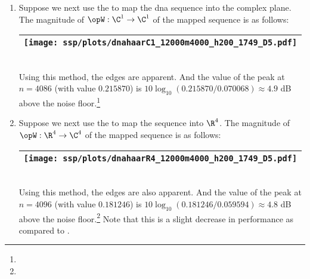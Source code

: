 \begin{example}
\begin{enumerate}
  \item \label{item:dna_haar_C1}
    Suppose we next use the   to map
    the dna sequence into the complex plane.
    The magnitude of $\opW:\C^1\to\C^1$ of the mapped sequence is as follows:
     \\\begin{tabular}{|>{\scs}c|}
          \hline
          \texttt{[image: ssp/plots/dnahaarC1\_12000m4000\_h200\_1749\_D5.pdf]}%
        \\\hline
     \end{tabular}\\
     Using this method, the edges are apparent.
     And the value of the peak at $n=4086$ (with value $0.215870$) is 
     $10\log_{10}(0.215870/0.070068)\approx 4.9$ dB above the noise floor.\footnote{}


  \item \label{item:dna_haar_R4}
    Suppose we next use the   to map
    the sequence into $\R^4$.
    The magnitude of $\opW:\R^4\to\C^4$ of the mapped sequence is as follows:
     \\\begin{tabular}{|>{\scs}c|}
          \hline
          \texttt{[image: ssp/plots/dnahaarR4\_12000m4000\_h200\_1749\_D5.pdf]}%
        \\\hline
     \end{tabular}\\
     Using this method, the edges are also apparent.
     And the value of the peak at $n=4096$ (with value $0.181246$) is 
     $10\log_{10}(0.181246/0.059594)\approx4.8$ dB
     above the noise floor.\footnote{}
     Note that this is a slight decrease in performance as compared to .


\end{enumerate}
\end{example}
